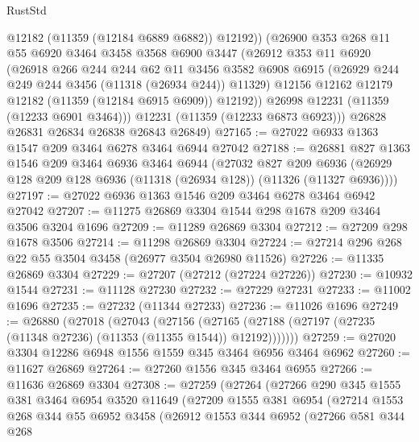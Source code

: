 \begin{lexlean}{RustStd}
\begin{coremodule}
{{{{{{{{{{{{{{{{{{{            @12182
            (@11359 (@12184 @6889 @6882))
            @12192))
        (@26900
          @353
          @268
          @11
          @55
          @6920
          @3464
          @3458
          @3568
          @6900
          @3447
          (@26912
            @353
            @11
            @6920
            (@26918
              @266
              @244
              @244
              @62
              @11
              @3456
              @3582
              @6908
              @6915
              (@26929 @244 @249 @244 @3456 (@11318 (@26934 @244)) @11329)
              @12156
              @12162
              @12179
              @12182
              (@11359 (@12184 @6915 @6909))
              @12192))
          @26998
          @12231
          (@11359 (@12233 @6901 @3464)))
        @12231
        (@11359 (@12233 @6873 @6923)))
      @26828
      @26831
      @26834
      @26838
      @26843
      @26849)
@27165 := @27022 @6933 @1363 @1547 @209 @3464 @6278 @3464 @6944 @27042
@27188 := @26881
    @827
    @1363
    @1546
    @209
    @3464
    @6936
    @3464
    @6944
    (@27032
      @827
      @209
      @6936
      (@26929 @128 @209 @128 @6936 (@11318 (@26934 @128)) (@11326 (@11327 @6936))))
@27197 := @27022 @6936 @1363 @1546 @209 @3464 @6278 @3464 @6942 @27042
@27207 := @11275 @26869 @3304 @1544 @298 @1678 @209 @3464 @3506 @3204 @1696
@27209 := @11289 @26869 @3304
@27212 := @27209 @298 @1678 @3506
@27214 := @11298 @26869 @3304
@27224 := @27214 @296 @268 @22 @55 @3504 @3458 (@26977 @3504 @26980 @11526)
@27226 := @11335 @26869 @3304
@27229 := @27207 (@27212 (@27224 @27226))
@27230 := @10932 @1544
@27231 := @11128 @27230
@27232 := @27229 @27231
@27233 := @11002 @1696
@27235 := @27232 (@11344 @27233)
@27236 := @11026 @1696
@27249 := @26880
    (@27018
      (@27043
        (@27156
          (@27165 (@27188 (@27197 (@27235 (@11348 @27236) (@11353 (@11355 @1544)) @12192)))))))
@27259 := @27020 @3304 @12286 @6948 @1556 @1559 @345 @3464 @6956 @3464 @6962
@27260 := @11627 @26869
@27264 := @27260 @1556 @345 @3464 @6955
@27266 := @11636 @26869 @3304
@27308 := @27259
    (@27264
      (@27266
        @290
        @345
        @1555
        @381
        @3464
        @6954
        @3520
        @11649
        (@27209
          @1555
          @381
          @6954
          (@27214
            @1553
            @268
            @344
            @55
            @6952
            @3458
            (@26912
              @1553
              @344
              @6952
              (@27266
                @581
                @344
                @268
}}}}}}}}}}}}}}}}}}}
\end{coremodule}
\end{lexlean}
